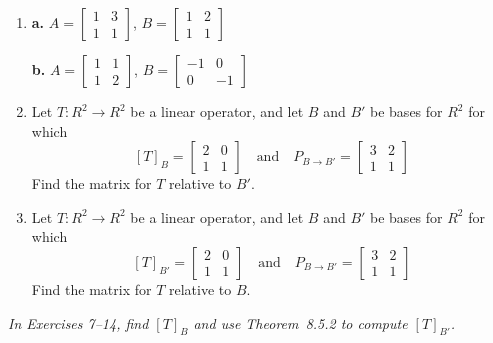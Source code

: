 \documentclass{article}
\begin{document}
\begin{enumerate}
  \item
    \textbf{a.}\;
    $A = \begin{bmatrix}1&3\\1&1\end{bmatrix}$,\quad
    $B = \begin{bmatrix}1&2\\1&1\end{bmatrix}$

    \textbf{b.}\;
    $A = \begin{bmatrix}1&1\\1&2\end{bmatrix}$,\quad
    $B = \begin{bmatrix}-1&0\\0&-1\end{bmatrix}$

  \item[3.] Let $T : R^2 \to R^2$ be a linear operator, and let $B$ and $B'$ be bases for
        $R^2$ for which
        \[
          [T]_B = \begin{bmatrix}2&0\\1&1\end{bmatrix} \quad\text{and}\quad
          P_{B\to B'} = \begin{bmatrix}3&2\\1&1\end{bmatrix}
        \]
        Find the matrix for $T$ relative to $B'$.

  \item[5.] Let $T : R^2 \to R^2$ be a linear operator, and let $B$ and $B'$ be bases for
        $R^2$ for which
        \[
          [T]_{B'} = \begin{bmatrix}2&0\\1&1\end{bmatrix} \quad\text{and}\quad
          P_{B\to B'} = \begin{bmatrix}3&2\\1&1\end{bmatrix}
        \]
        Find the matrix for $T$ relative to $B$.

\end{enumerate}

\noindent\textit{In Exercises 7--14, find $[T]_B$ and use Theorem~8.5.2 to compute
$[T]_{B'}$.}
\end{document}

